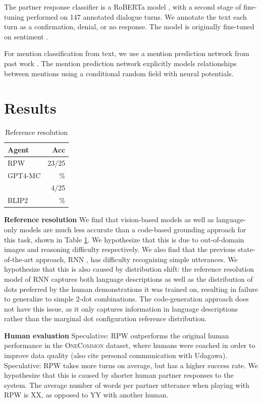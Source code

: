 \documentclass[11pt]{article}
\newcommand{\system}{RPW}
\begin{document}
The partner response classifier is a RoBERTa model \citep{roberta}, with a second stage of fine-tuning performed on 147 annotated dialogue turns.
We annotate the text each turn as a confirmation, denial, or no response.
The model is originally fine-tuned on sentiment \citep{heitmann2020}.

For mention classification from text, we use a mention prediction network from past work \citep{fried}.
The mention prediction network explicitly models relationships between mentions using a conditional random field with neural potentials.

\section{Results}

\begin{table}[!t]
\centering
\begin{tabular}{lr}
\toprule
Agent                    & Acc\\
\midrule
\system{}                &  23/25 \\
GPT4-MC                  & \%  \\
\citet{fried}            & 4/25  \\
BLIP2                    & \%  \\
\bottomrule
\end{tabular}
\caption{\label{tbl:refres}
Reference resolution
}
\end{table}

\textbf{Reference resolution}
We find that vision-based models as well as 
language-only models are much less accurate than
a code-based grounding approach for this task,
shown in Table \ref{tbl:refres}.
We hypothesize that this is due to out-of-domain images
and reasoning difficulty respectively.
We also find that the previous state-of-the-art approach,
RNN \citep{fried}, has difficulty recognizing simple utterances.
We hypothesize that this is also caused by distribution shift:
the reference resolution model of RNN captures both
language descriptions as well as the distribution of dots
preferred by the human demonstrations it was trained on,
resulting in failure to generalize to simple 2-dot combinations.
The code-generation approach does not have this issue,
as it only captures information in language descriptions
rather than the marginal dot configuration reference distribution.

\textbf{Human evaluation}
Speculative: \system{} outperforms the original human performance in
the \textsc{OneCommon} dataset,
where humans were coached in order to improve data quality \citep{onecommon}
(also cite personal communication with Udagawa).
Speculative: \system{} takes more turns on average, but
has a higher success rate.
We hypothesize that this is caused by shorter human partner
responses to the system.
The average number of words per partner utterance when playing with
\system{} is XX, as opposed to YY with another human.
\end{document}
